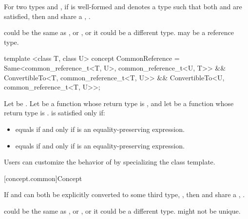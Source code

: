 \pnum
For two types  and , if 
is well-formed and denotes a type  such that both
and
are satisfied, then  and  share a
, .
\begin{note}
 could be the same as , or , or it could be a
different type.  may be a reference type.
\end{note}

%
\begin{itemdecl}
template <class T, class U>
concept CommonReference =
  Same<common_reference_t<T, U>, common_reference_t<U, T>> &&
  ConvertibleTo<T, common_reference_t<T, U>> &&
  ConvertibleTo<U, common_reference_t<T, U>>;
\end{itemdecl}

\begin{itemdescr}
\pnum
Let  be . Let  be a
function whose return type is , and let  be a function
whose return type is .  is
satisfied only if:
\begin{itemize}
\item {} equals  if and only if  is an
  equality-preserving expression.
\item {} equals  if and only if  is an
  equality-preserving expression.
\end{itemize}

\pnum
\begin{note}
Users can customize the behavior of  by specializing
the  class template.
\end{note}
\end{itemdescr}

[concept.common]{Concept }

\pnum
If  and  can both be explicitly converted to some third type,
, then  and  share a ,
.
\begin{note}
 could be the same as , or , or it could be a
different type.  might not be unique.
\end{note}

